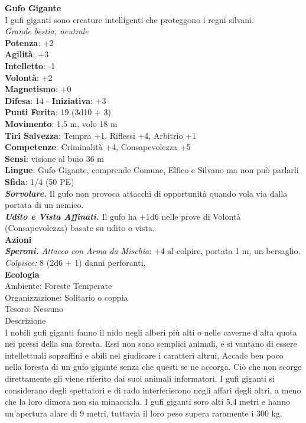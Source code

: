 \begin{multicols}{2}
\medskip\textbf{Gufo Gigante}\\
I gufi giganti sono creature intelligenti che proteggono i regni silvani.\\
\emph{Grande bestia, neutrale}\\
\textbf{Potenza}: +2\\
\textbf{Agilità}: +3\\
\textbf{Intelletto}: -1\\
\textbf{Volontà}: +2\\
\textbf{Magnetismo}: +0\\
\textbf{Difesa}: 14 - \textbf{Iniziativa}: +3\\
\textbf{Punti Ferita}: 19 (3d10 + 3)\\
\textbf{Movimento}: 1,5 m, volo 18 m\\
\textbf{Tiri Salvezza}: Tempra +1, Riflessi +4, Arbitrio +1 \\
\textbf{Competenze}: Criminalità +4, Consapevolezza +5\\
\textbf{Sensi}: visione al buio 36 m\\
\textbf{Lingue}: Gufo Gigante, comprende Comune, Elfico e Silvano ma non può parlarli\\
\textbf{Sfida}: 1/4 (50 PE)\smallskip\\
\emph{\textbf{Sorvolare.}} Il gufo non provoca attacchi di opportunità quando vola via dalla portata di un nemico.\\
\emph{\textbf{Udito e Vista Affinati.}} Il gufo ha +1d6 nelle prove di Volontà (Consapevolezza) basate su udito o vista.\\
\smallskip\textbf{Azioni}\\
\emph{\textbf{Speroni.} Attacco con Arma da Mischia}: +4 al colpire, portata 1 m, un bersaglio.\\
\emph{Colpisce:} 8 (2d6 + 1) danni perforanti.\\
\textbf{Ecologia}\\
Ambiente: Foreste Temperate\\
Organizzazione: Solitario o coppia\\
Tesoro: Nessuno\\
Descrizione\\

I nobili gufi giganti fanno il nido negli alberi più alti o nelle caverne d'alta quota nei pressi della sua foresta. Essi non sono semplici animali, e si vantano di essere intellettuali sopraffini e abili nel giudicare i caratteri altrui, Accade ben poco nella foresta di un gufo gigante senza che questi se ne accorga. Ciò che non scorge direttamente gli viene riferito dai suoi animali informatori. I gufi giganti si considerano degli spettatori e di rado interferiscono negli affari degli altri, a meno che la loro dimora non sia minacciala. I gufi giganti soro alti 5,4 metri e hanno un'apertura alare di 9 metri, tuttavia il loro peso supera raramente i 300 kg. \\



\end{multicols}

